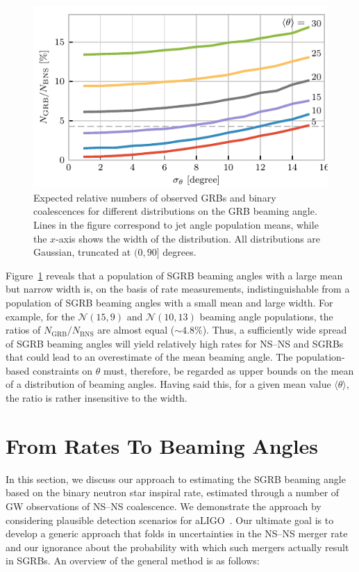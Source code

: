 \documentclass[twocolumn,nofootinbib]{revtex4-1}
\newcommand{\BNS}{\ac{NS}--\ac{NS}\xspace}
\begin{document}
\begin{figure}
\centering
\includegraphics[width=\linewidth]{color_relativenumber.pdf}
\caption{\label{fig:thetapopulation} Expected relative numbers of
  observed GRBs and binary coalescences for different distributions on
  the GRB beaming angle.  Lines in the figure correspond to jet angle
  population means, while the $x$-axis shows the width of the
  distribution.  All distributions are Gaussian, truncated at
  $(0, 90]$ degrees.\label{fig:thetapop}}
\end{figure}




Figure~\ref{fig:thetapop} reveals that a population of \ac{SGRB} beaming angles with a large mean but narrow width is, on the basis of rate measurements, indistinguishable from a population of \ac{SGRB} beaming angles with a small mean and large width.
For example, for the ${\mathcal N}(15,9)$ and ${\mathcal N}(10,13)$ beaming angle populations, the ratios of $N_{\mathrm{GRB}}/N_{\mathrm{BNS}}$ are almost equal ($\sim 4.8\%$).
Thus, a sufficiently wide spread of \ac{SGRB} beaming angles will yield relatively high rates for \BNS and \acp{SGRB} that could lead to an overestimate of the mean beaming angle.
The population-based constraints on $\theta$ must, therefore, be regarded as upper bounds on the mean of a distribution of beaming angles.
Having said this, for a given mean value $\langle \theta \rangle$, the ratio is rather insensitive to the width.


\section{From Rates To Beaming Angles}

In this section, we discuss our approach to estimating the \ac{SGRB} beaming angle based on the binary neutron star inspiral rate, estimated through a number of \ac{GW} observations of \BNS coalescence.
We demonstrate the approach by considering plausible detection scenarios for \ac{aLIGO}~\cite{Aasi:2013wya}.
Our ultimate goal is to develop a generic approach that folds in uncertainties in the \BNS merger rate and our ignorance about the probability with which such mergers actually result in \acp{SGRB}.
%
An overview of the general method is as follows:
\end{document}
